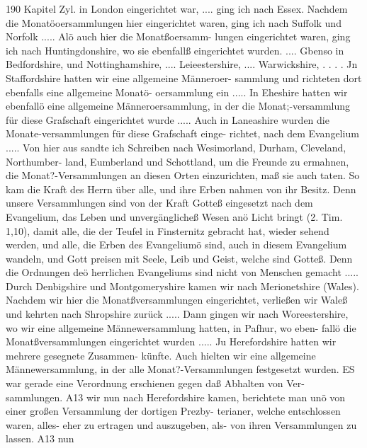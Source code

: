 190 Kapitel Zyl.
in London eingerichtet war, .... ging ich nach Essex. Nachdem
die Monatöoersammlungen hier eingerichtet waren, ging ich nach
Suffolk und Norfolk ..... Alö auch hier die Monatßoersamm-
lungen eingerichtet waren, ging ich nach Huntingdonshire, wo sie
ebenfallß eingerichtet wurden. .... Gbenso in Bedfordshire,
und Nottinghamshire, .... Leieestershire, .... Warwickshire,
. . . . Jn Staffordshire hatten wir eine allgemeine Männeroer-
sammlung und richteten dort ebenfalls eine allgemeine Monatö-
oersammlung ein ..... In Eheshire hatten wir ebenfallö eine
allgemeine Männeroersammlung, in der die Monat;-versammlung
für diese Grafschaft eingerichtet wurde ..... Auch in Laneashire
wurden die Monate-versammlungen für diese Grafschaft einge-
richtet, nach dem Evangelium ..... Von hier aus sandte ich
Schreiben nach Wesimorland, Durham, Cleveland, Northumber-
land, Eumberland und Schottland, um die Freunde zu ermahnen,
die Monat?-Versammlungen an diesen Orten einzurichten, maß sie
auch taten. So kam die Kraft des Herrn über alle, und ihre
Erben nahmen von ihr Besitz. Denn unsere Versammlungen
sind von der Kraft Gotteß eingesetzt nach dem Evangelium, das
Leben und unvergänglicheß Wesen anö Licht bringt (2. Tim. 1,10),
damit alle, die der Teufel in Finsternitz gebracht hat, wieder
sehend werden, und alle, die Erben des Evangeliumö sind, auch in
diesem Evangelium wandeln, und Gott preisen mit Seele, Leib und
Geist, welche sind Gotteß. Denn die Ordnungen deö herrlichen
Evangeliums sind nicht von Menschen gemacht .....
Durch Denbigshire und Montgomeryshire kamen wir nach
Merionetshire (Wales). Nachdem wir hier die Monatßversammlungen
eingerichtet, verließen wir Waleß und kehrten nach Shropshire
zurück ..... Dann gingen wir nach Woreestershire, wo wir
eine allgemeine Männewersammlung hatten, in Pafhur, wo eben-
fallö die Monatßversammlungen eingerichtet wurden .....
Ju Herefordshire hatten wir mehrere gesegnete Zusammen-
künfte. Auch hielten wir eine allgemeine Männewersammlung,
in der alle Monat?-Versammlungen festgesetzt wurden. ES war
gerade eine Verordnung erschienen gegen daß Abhalten von Ver-
sammlungen. A13 wir nun nach Herefordshire kamen, berichtete
man unö von einer großen Versammlung der dortigen Prezby-
terianer, welche entschlossen waren, alles- eher zu ertragen und
auszugeben, als- von ihren Versammlungen zu lassen. A13 nun


